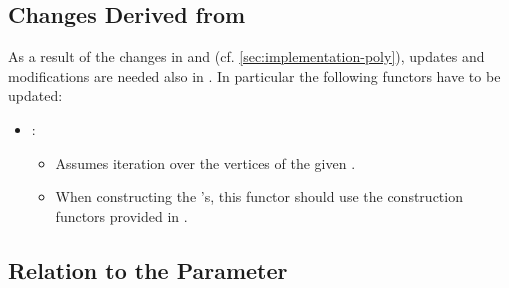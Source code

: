 \documentclass[a4paper,10pt]{article}
\begin{document}
\subsection{Changes Derived from \poly}
\label{sec:changes-derived-from-polytr}

As a result of the changes in \poly and \xpoly (cf. \cref{sec:implementation-poly}), updates and modifications are needed also in \polytr.
In particular the following functors have to be updated:
\begin{itemize}
\item {}:
  \begin{itemize}
  \item Assumes iteration over the vertices of the given \poly.
  \item When constructing the \xpoly's, this functor should use the construction functors provided in \polytr.
  \end{itemize}
\end{itemize}


\subsection{Relation to the \segtr Parameter}
\label{sec:relat-segtr-param-polytr}
\end{document}

